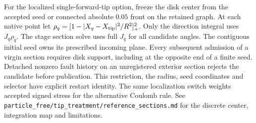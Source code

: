 \documentclass[11pt]{article}
\begin{document}
For the localized single-forward-tip option, freeze the disk center from the
accepted seed or connected absolute $0.05$ front on the retained graph. At
each native point let $\rho_q=[1-|X_q-X_{\rm tip}|^2/R^2]_+^2$.
Only the direction integral uses $J_q\rho_q$. The stage section solve uses
full $J_q$ for all candidate angles. The contiguous initial seed owns its prescribed incoming plane. Every
subsequent admission of a virgin section requires disk support, including
at the opposite end of a finite seed. Detached nonzero fault history on an unregistered exterior section
rejects the candidate before publication. This restriction, the radius, seed
coordinates and selector have explicit restart identity. The same localization
switch weights accepted signed stress for the alternative Coulomb rule.
See \texttt{particle\_free/tip\_treatment/reference\_sections.md} for the
discrete center, integration map and limitations.
\end{document}
